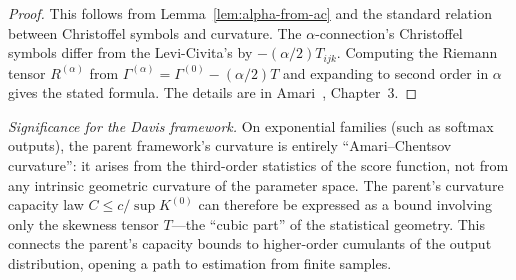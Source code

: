 \documentclass[11pt]{article}
\theoremstyle{remark}
\begin{document}
\begin{proof}
This follows from Lemma~\ref{lem:alpha-from-ac} and the standard relation
between Christoffel symbols and curvature.  The $\alpha$-connection's
Christoffel symbols differ from the Levi-Civita's by $-(\alpha/2)T_{ijk}$.
Computing the Riemann tensor $R^{(\alpha)}$ from
$\Gamma^{(\alpha)} = \Gamma^{(0)} - (\alpha/2)T$ and expanding to second
order in $\alpha$ gives the stated formula.  The details are in
Amari~\cite{amari1985}, Chapter~3.
\end{proof}

\noindent\emph{Significance for the Davis framework.}  On exponential families
(such as softmax outputs), the parent framework's curvature is entirely
``Amari--Chentsov curvature'': it arises from the third-order statistics of
the score function, not from any intrinsic geometric curvature of the
parameter space.  The parent's curvature capacity law
$C \le c/\sup K^{(0)}$ can therefore be expressed as a bound involving only
the skewness tensor $T$---the ``cubic part'' of the statistical geometry.
This connects the parent's capacity bounds to higher-order cumulants of the
output distribution, opening a path to estimation from finite samples.
\end{document}
